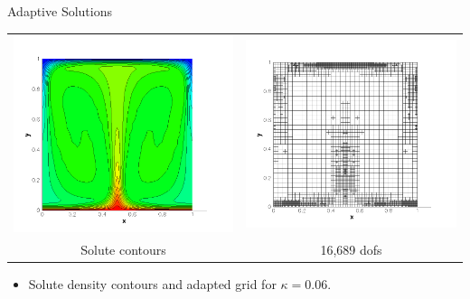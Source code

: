 \documentclass[compress,12pt]{beamer}
\begin{document}
\begin{frame}{Adaptive Solutions}
  {
    \begin{center}
      \begin{tabular}{cc} \\
	\includegraphics[width=.5\textwidth]{figures/s_adapt_kappa_0_06}&
	\includegraphics[width=.5\textwidth]{figures/grid_adapt_kappa_0_06}\\
	Solute contours &
	16,689 dofs
      \end{tabular}\end{center}
    \begin{itemize}
      
    \item Solute density contours and adapted grid for $\kappa=0.06$.
    \end{itemize}
  }


\end{frame}
\end{document}
